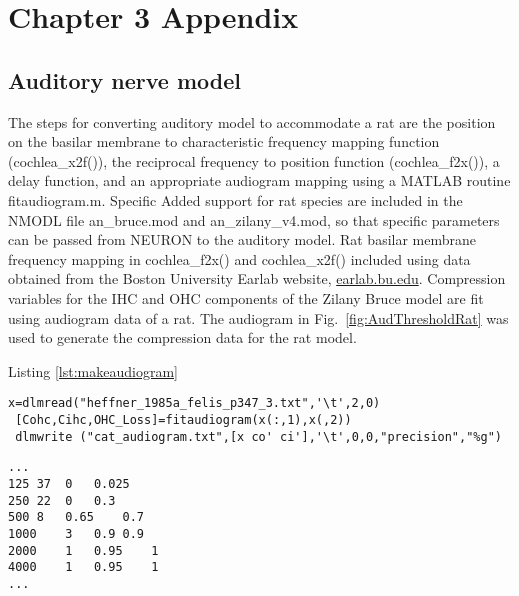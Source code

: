 \graphicspath{{../figures/}{./gfx/}{/media/data/Work/cnstellate/}{/media/data/Work/cnstellate/Responses/}}

\chapter{Chapter 3 Appendix}

\section{Auditory nerve model}

The steps for converting \citet{ZilanyBruce:2007} auditory model to
accommodate a rat are the position on the basilar membrane to
characteristic frequency mapping function (\mbox{\textsf{cochlea\_x2f()}}), the
reciprocal frequency to position function (\mbox{\textsf{cochlea\_f2x()}}), a
delay function, and an appropriate audiogram mapping using a MATLAB
routine \mbox{\textsf{fitaudiogram.m}}.  Specific Added support for rat species
are included in the NMODL file \mbox{\textsf{an\_bruce.mod}} and \mbox{\textsf{an\_zilany\_v4.mod}}, so that specific
parameters can be passed from NEURON to the auditory model.  Rat
basilar membrane frequency mapping in \mbox{\textsf{cochlea\_f2x()}} and
\mbox{\textsf{cochlea\_x2f()}} included using data obtained from the Boston University Earlab
website, \url{earlab.bu.edu}.  Compression variables for the IHC and OHC
components of the Zilany Bruce model are fit using audiogram data of a
rat.  The audiogram in Fig.~\ref{fig:AudThresholdRat} was used to
generate the compression data for the rat model.

\medskip{}

Listing \ref{lst:makeaudiogram}
\begin{lstlisting}[label=lst:makeaudiogram,caption=Using fitaudiogram.m to create COHC and CIHC vectors for the cat.]
 x=dlmread("heffner_1985a_felis_p347_3.txt",'\t',2,0)
 [Cohc,Cihc,OHC_Loss]=fitaudiogram(x(:,1),x(,2))
 dlmwrite ("cat_audiogram.txt",[x co' ci'],'\t',0,0,"precision","%g")
\end{lstlisting}


\begin{lstlisting}[label=lst:cataudiogram,caption=Portion of cat\_audiogram.txt]
...
125	37	0	0.025
250	22	0	0.3
500	8	0.65	0.7
1000	3	0.9	0.9
2000	1	0.95	1
4000	1	0.95	1
...
\end{lstlisting}


